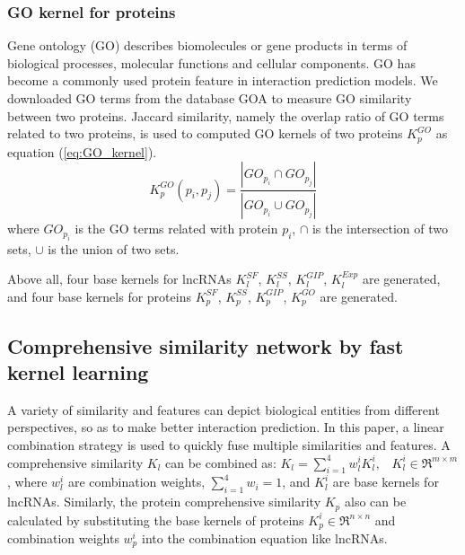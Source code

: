 \documentclass[fleqn,10pt]{wlscirep}
\begin{document}
\subsubsection*{GO kernel for proteins}
Gene ontology (GO) describes biomolecules or gene products in terms of biological processes, molecular functions and cellular components. GO has become a commonly used protein feature in interaction prediction models. We downloaded GO terms from the database GOA\cite{Wan2013} to measure GO similarity between two proteins. Jaccard similarity, namely the overlap ratio of GO terms related to two proteins, is used to computed GO kernels of two proteins ${{K}}_p^{GO}$ as equation (\ref{eq:GO_kernel}).
\begin{equation}\label{eq:GO_kernel}
{{K}}_p^{GO}({p_i},{p_j}) = \frac{{\left| {G{O_{{p_i}}} \cap G{O_{{p_j}}}} \right|}}{{\left| {G{O_{{p_i}}} \cup G{O_{{p_j}}}} \right|}}
\end{equation}
where ${G{O_{{p_i}}}}$ is the GO terms related with protein ${p_i}$, $ \cap $ is the intersection of two sets, $ \cup $ is the union of two sets.

Above all, four base kernels for lncRNAs ${{K}}_l^{SF}$, ${{K}}_l^{SS}$, ${{K}}_l^{GIP}$, ${{K}}_l^{Exp}$ are generated, and four base kernels for proteins ${{K}}_p^{SF}$, ${{K}}_p^{SS}$, ${{K}}_p^{GIP}$, ${{K}}_p^{GO}$ are generated.

\subsection*{Comprehensive similarity network by fast kernel learning}
A variety of similarity and features can depict biological entities from different perspectives, so as to make better interaction prediction. In this paper, a linear combination strategy is used to quickly fuse multiple similarities and features\cite{He2008,Shen2019}. A comprehensive  similarity ${{{K}}_l}$ can be combined as: ${{{K}}_l} = \sum\limits_{i = 1}^4 {w_l^i} {{K}}_l^i,\;\;\;{{K}}_l^i \in {\Re ^{m \times m}}$, where ${w_l^i}$ are combination weights, $\sum\limits_{i = 1}^4 {{w_i}}=1$, and ${{K}}_l^i$ are base kernels for lncRNAs. Similarly, the protein comprehensive similarity ${{{K}}_p}$ also can be calculated by substituting the base kernels of proteins ${{K}}_p^i \in {\Re ^{n \times n}}$ and combination weights ${w_p^i}$ into the combination equation like lncRNAs. 
\end{document}
